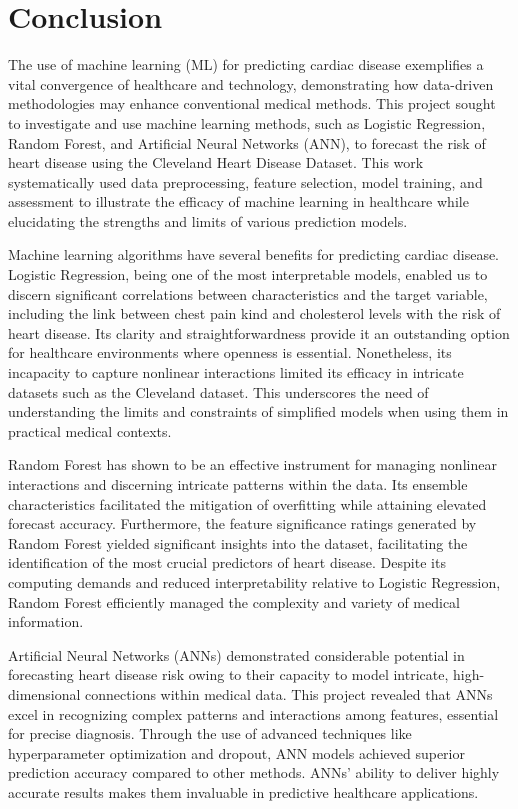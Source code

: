 \section{Conclusion}
The use of machine learning (ML) for predicting cardiac disease exemplifies a vital convergence of healthcare and technology, demonstrating how data-driven methodologies may enhance conventional medical methods. This project sought to investigate and use machine learning methods, such as Logistic Regression, Random Forest, and Artificial Neural Networks (ANN), to forecast the risk of heart disease using the Cleveland Heart Disease Dataset. This work systematically used data preprocessing, feature selection, model training, and assessment to illustrate the efficacy of machine learning in healthcare while elucidating the strengths and limits of various prediction models.

Machine learning algorithms have several benefits for predicting cardiac disease. Logistic Regression, being one of the most interpretable models, enabled us to discern significant correlations between characteristics and the target variable, including the link between chest pain kind and cholesterol levels with the risk of heart disease. Its clarity and straightforwardness provide it an outstanding option for healthcare environments where openness is essential. Nonetheless, its incapacity to capture nonlinear interactions limited its efficacy in intricate datasets such as the Cleveland dataset. This underscores the need of understanding the limits and constraints of simplified models when using them in practical medical contexts.

Random Forest has shown to be an effective instrument for managing nonlinear interactions and discerning intricate patterns within the data. Its ensemble characteristics facilitated the mitigation of overfitting while attaining elevated forecast accuracy. Furthermore, the feature significance ratings generated by Random Forest yielded significant insights into the dataset, facilitating the identification of the most crucial predictors of heart disease. Despite its computing demands and reduced interpretability relative to Logistic Regression, Random Forest efficiently managed the complexity and variety of medical information.

Artificial Neural Networks (ANNs) demonstrated considerable potential in forecasting heart disease risk owing to their capacity to model intricate, high-dimensional connections within medical data. This project revealed that ANNs excel in recognizing complex patterns and interactions among features, essential for precise diagnosis. Through the use of advanced techniques like hyperparameter optimization and dropout, ANN models achieved superior prediction accuracy compared to other methods. ANNs' ability to deliver highly accurate results makes them invaluable in predictive healthcare applications.

